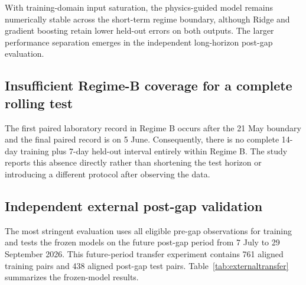\documentclass[preprint,12pt,authoryear]{elsarticle}
\begin{document}
\begin{table}[htbp]
\centering
\caption{Held-out A-to-B transfer performance. Density errors are in g cm$^{-3}$.}
\label{tab:transfer}
\end{table}

With training-domain input saturation, the physics-guided model remains numerically stable across the short-term regime boundary, although Ridge and gradient boosting retain lower held-out errors on both outputs. The larger performance separation emerges in the independent long-horizon post-gap evaluation.

\subsection{Insufficient Regime-B coverage for a complete rolling test}

The first paired laboratory record in Regime B occurs after the 21 May boundary and the final paired record is on 5 June. Consequently, there is no complete 14-day training plus 7-day held-out interval entirely within Regime B. The study reports this absence directly rather than shortening the test horizon or introducing a different protocol after observing the data.

\subsection{Independent external post-gap validation}

The most stringent evaluation uses all eligible pre-gap observations for training and tests the frozen models on the future post-gap period from 7 July to 29 September 2026. This future-period transfer experiment contains 761 aligned training pairs and 438 aligned post-gap test pairs. Table~\ref{tab:externaltransfer} summarizes the frozen-model results.
\end{document}
